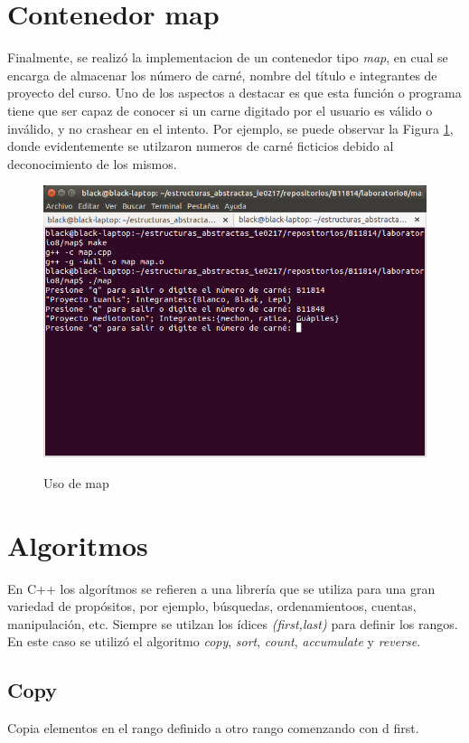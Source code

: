 \documentclass{article}
\begin{document}
\section{Contenedor map}
Finalmente, se realiz\' o la implementacion de un contenedor tipo \textit{map}, en cual se encarga de almacenar los n\' umero de carn\' e, nombre del t\' itulo e integrantes de proyecto del curso. 
Uno de los aspectos a destacar es que esta funci\' on o programa tiene que ser capaz de conocer si un carne digitado por el usuario es v\' alido o inv\' alido, y no crashear en el intento.
Por ejemplo, se puede observar la Figura \ref{fig:map}, donde evidentemente se utilzaron numeros de carn\' e ficticios debido al deconocimiento de los mismos.

\begin{figure}[hbtp]
\caption{Uso de map}
\centering
\includegraphics[scale=0.6]{imagenes/map.png}
\label{fig:map}
\end{figure}

\section{Algoritmos}
En C++ los algor\' itmos se refieren a una librer\' ia  que se utiliza para una gran variedad de prop\' ositos, por ejemplo, b\' usquedas, ordenamientoos, cuentas, manipulaci\' on, etc. Siempre se utilzan los \' idices \textit{(first,last)} para definir los rangos. 
En este caso se utiliz\' o el algoritmo \textit{copy}, \textit{sort}, \textit{count}, \textit{accumulate} y \textit{reverse}.

\subsection{Copy}
Copia elementos en el rango definido a otro rango comenzando con d first.
\end{document}
